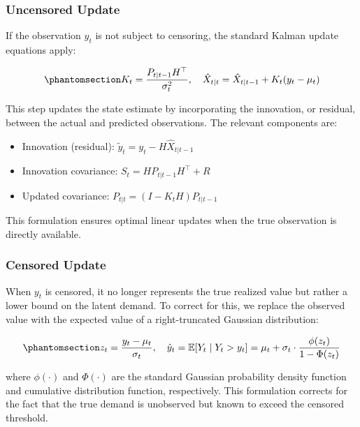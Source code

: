 \documentclass[
  11pt,
  authoryear,
  doubleblind,
  3p]{elsarticle}
\providecommand{\tightlist}{%
  \setlength{\itemsep}{0pt}\setlength{\parskip}{0pt}}
\begin{document}
\subsubsection{Uncensored Update}\label{uncensored-update}

If the observation \(y_t\) is not subject to censoring, the standard
Kalman update equations apply:

\begin{equation}\phantomsection\label{eq-seven}{
K_t = \frac{P_{t|t-1} H^\top}{\sigma^2_t}, \quad \hat{X}_{t|t} = \hat{X}_{t|t-1} + K_t (y_t - \mu_t)
}\end{equation}

This step updates the state estimate by incorporating the innovation, or
residual, between the actual and predicted observations. The relevant
components are:

\begin{itemize}
\tightlist
\item
  Innovation (residual): \(\tilde{y}_t = y_t - H \hat{X}_{t|t-1}\)
\item
  Innovation covariance: \(S_t = H P_{t|t-1} H^\top + R\)
\item
  Updated covariance: \(P_{t|t} = (I - K_t H) P_{t|t-1}\)
\end{itemize}

This formulation ensures optimal linear updates when the true
observation is directly available.

\subsubsection{Censored Update}\label{censored-update}

When \(y_t\) is censored, it no longer represents the true realized
value but rather a lower bound on the latent demand. To correct for
this, we replace the observed value with the expected value of a
right-truncated Gaussian distribution:

\begin{equation}\phantomsection\label{eq-eight}{
z_t = \frac{y_t - \mu_t}{\sigma_t}, \quad \hat{y}_t = \mathbb{E}[Y_t \mid Y_t > y_t] = \mu_t + \sigma_t \cdot \frac{\phi(z_t)}{1 - \Phi(z_t)}
}\end{equation}

where \(\phi(\cdot)\) and \(\Phi(\cdot)\) are the standard Gaussian
probability density function and cumulative distribution function,
respectively. This formulation corrects for the fact that the true
demand is unobserved but known to exceed the censored threshold.
\end{document}
